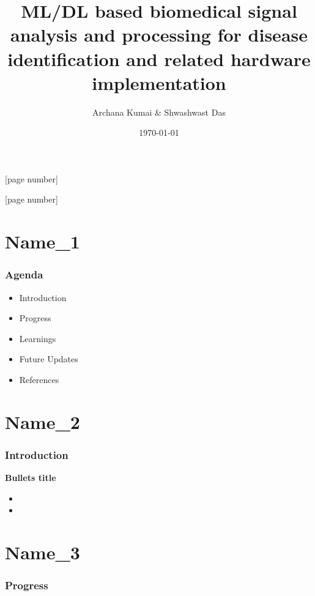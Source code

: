 \documentclass{beamer}
\title[Biomedical Signal Analysis]{ML/DL based biomedical signal analysis and processing for disease identification and related hardware implementation } %
\author[Archana Kumai \& Shwashwast Das]{Archana Kumai \& Shwashwast Das}
\institute[STUDENT ID] %
{

{\small Supervisor} \\
\medskip
{\small Prof. Sumitra Mukhopadhyay }\\
\vspace{0.5cm}
Institute of Radiophysics and Electronics\\
University of Calcutta

}
\date[\today]{\today}
\begin{document}
\begin{frame}
\titlepage %
[page number]

\end{frame}
[page number]



\section{Name\_1} 
\begin{frame}[allowframebreaks]
\frametitle{Agenda}
\begin{itemize}
\item {Introduction}
\vspace{0.15cm}
\item {Progress}
\vspace{0.15cm}
\item {Learnings}
\vspace{0.15cm}
\item {Future Updates}
\vspace{0.15cm}
\item {References}
\end{itemize}

\end{frame}



\section{Name\_2}
\begin{frame}[allowframebreaks]
\frametitle{Introduction}
\textbf{Bullets title}
\vspace{0.3cm}
\begin{itemize}
\item 
\vspace{0.15cm}
\item 
\end{itemize}

\end{frame}


\section{Name\_3}
\begin{frame}[allowframebreak]
\frametitle{Progress}\small

\end{frame}
\end{document}
